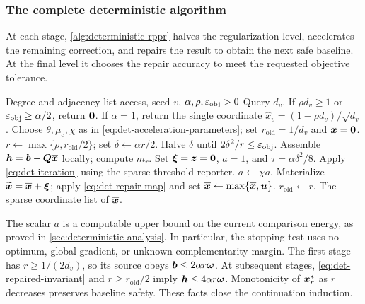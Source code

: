 \subsubsection{The complete deterministic algorithm}

At each stage, \cref{alg:deterministic-rppr} halves the regularization
level, accelerates the remaining correction, and repairs the result to
obtain the next safe baseline. At the final level it chooses the repair
accuracy to meet the requested objective tolerance.

\begin{algorithm}[htbp]
\caption{Deterministic accelerated local RPPR}
\label{alg:deterministic-rppr}
\begin{algorithmic}[1]
\REQUIRE Degree and adjacency-list access, seed $v$, $\alpha,\rho,\varepsilon_{\mathrm{obj}}>0$
\STATE Query $d_v$. If $\rho d_v\geq1$ or $\varepsilon_{\mathrm{obj}}\geq\alpha/2$, return $\bm{0}$.
\STATE If $\alpha=1$, return the single coordinate
       $\widehat x_v=(1-\rho d_v)/\sqrt{d_v}$.
\STATE Choose $\theta,\mu_{\mathrm{c}},\chi$ as in
       \cref{eq:det-acceleration-parameters}; set
       $r_{\mathrm{old}}=1/d_v$ and $\overline{\bm{x}}=\bm{0}$.
\REPEAT
  \STATE $r\gets\max\{\rho,r_{\mathrm{old}}/2\}$; set $\delta\gets\alpha r/2$.
    \STATE Halve $\delta$ until $2\delta^2/r\leq\varepsilon_{\mathrm{obj}}$.
  \ENDIF
  \STATE Assemble $\bm{h}=\bm{b}-\bm{Q}\overline{\bm{x}}$ locally; compute $m_r$.
  \STATE Set $\bm{\xi}=\bm{z}=\bm{0}$, $a=1$, and $\tau=\alpha\delta^2/8$.
    \STATE Apply \cref{eq:det-iteration} using the sparse threshold reporter.
    \STATE $a\gets\chi a$.
  \ENDWHILE
  \STATE Materialize $\widetilde{\bm{x}}=\overline{\bm{x}}+\bm{\xi}$; apply
         \cref{eq:det-repair-map} and set
         $\overline{\bm{x}}\gets\max\{\overline{\bm{x}},\bm{u}\}$.
  \STATE $r_{\mathrm{old}}\gets r$.
\RETURN The sparse coordinate list of $\overline{\bm{x}}$.
\end{algorithmic}
\end{algorithm}
\FloatBarrier

The scalar $a$ is a computable upper bound on the current comparison
energy, as proved in \cref{sec:deterministic-analysis}. In particular, the stopping test uses no optimum,
global gradient, or unknown complementarity margin.
The first stage has $r\geq1/(2d_v)$, so its source obeys
$\bm{b}\leq2\alpha r\bm{\omega}$. At subsequent stages,
\cref{eq:det-repaired-invariant} and $r\geq r_{\mathrm{old}}/2$ imply
$\bm{h}\leq4\alpha r\bm{\omega}$. Monotonicity of $\bm{x}_r^*$ as $r$ decreases
preserves baseline safety. These facts close the continuation induction.

